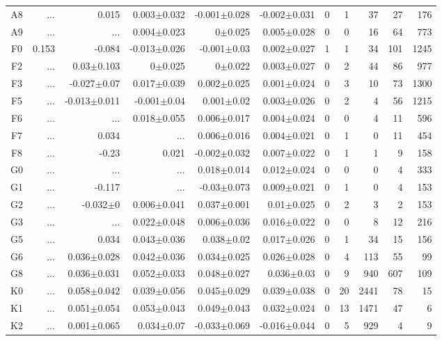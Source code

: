 \begin{table}[t]
\begin{table}[t]
\begin{center}
\begin{tabular}{c|rrrrr|rrrrr}
    A8	&	 ...	&	0.015	&	0.003$\pm$0.032	&	-0.001$\pm$0.028	&	-0.002$\pm$0.031	&	0	&	1	&	37	&	27	&	176	\\
    A9	&	 ...	&	 ...	&	0.004$\pm$0.023	&	0$\pm$0.025	&	0.005$\pm$0.028	&	0	&	0	&	16	&	64	&	773	\\
    F0	&	0.153	&	-0.084	&	-0.013$\pm$0.026	&	-0.001$\pm$0.03	&	0.002$\pm$0.027	&	1	&	1	&	34	&	101	&	1245	\\
    F2	&	 ...	&	0.03$\pm$0.103	&	0$\pm$0.025	&	0$\pm$0.022	&	0.003$\pm$0.027	&	0	&	2	&	44	&	86	&	977	\\
    F3	&	 ...	&	-0.027$\pm$0.07	&	0.017$\pm$0.039	&	0.002$\pm$0.025	&	0.001$\pm$0.024	&	0	&	3	&	10	&	73	&	1300	\\
    F5	&	 ...	&	-0.013$\pm$0.011	&	-0.001$\pm$0.04	&	0.001$\pm$0.02	&	0.003$\pm$0.026	&	0	&	2	&	4	&	56	&	1215	\\
    F6	&	 ...	&	 ...	&	0.018$\pm$0.055	&	0.006$\pm$0.017	&	0.004$\pm$0.024	&	0	&	0	&	4	&	11	&	596	\\
    F7	&	 ...	&	0.034	&	 ...	&	0.006$\pm$0.016	&	0.004$\pm$0.021	&	0	&	1	&	0	&	11	&	454	\\
    F8	&	 ...	&	-0.23	&	0.021	&	-0.002$\pm$0.032	&	0.007$\pm$0.022	&	0	&	1	&	1	&	9	&	158	\\
    G0	&	 ...	&	 ...	&	 ...	&	0.018$\pm$0.014	&	0.012$\pm$0.024	&	0	&	0	&	0	&	4	&	333	\\
    G1	&	 ...	&	-0.117	&	 ...	&	-0.03$\pm$0.073	&	0.009$\pm$0.021	&	0	&	1	&	0	&	4	&	153	\\
    G2	&	 ...	&	-0.032$\pm$0	&	0.006$\pm$0.041	&	0.037$\pm$0.001	&	0.01$\pm$0.025	&	0	&	2	&	3	&	2	&	153	\\
    G3	&	 ...	&	 ...	&	0.022$\pm$0.048	&	0.006$\pm$0.036	&	0.016$\pm$0.022	&	0	&	0	&	8	&	12	&	216	\\
    G5	&	 ...	&	0.034	&	0.043$\pm$0.036	&	0.038$\pm$0.02	&	0.017$\pm$0.026	&	0	&	1	&	34	&	15	&	156	\\
    G6	&	 ...	&	0.036$\pm$0.028	&	0.042$\pm$0.036	&	0.034$\pm$0.025	&	0.026$\pm$0.028	&	0	&	4	&	113	&	55	&	99	\\
    G8	&	 ...	&	0.036$\pm$0.031	&	0.052$\pm$0.033	&	0.048$\pm$0.027	&	0.036$\pm$0.03	&	0	&	9	&	940	&	607	&	109	\\
    K0	&	 ...	&	0.058$\pm$0.042	&	0.039$\pm$0.056	&	0.045$\pm$0.029	&	0.039$\pm$0.038	&	0	&	20	&	2441	&	78	&	15	\\
    K1	&	 ...	&	0.051$\pm$0.054	&	0.053$\pm$0.043	&	0.049$\pm$0.043	&	0.032$\pm$0.024	&	0	&	13	&	1471	&	47	&	6	\\
    K2	&	 ...	&	0.001$\pm$0.065	&	0.034$\pm$0.07	&	-0.033$\pm$0.069	&	-0.016$\pm$0.044	&	0	&	5	&	929	&	4	&	9	\\

\end{tabular}
\end{center}
\end{table}
\end{table}
